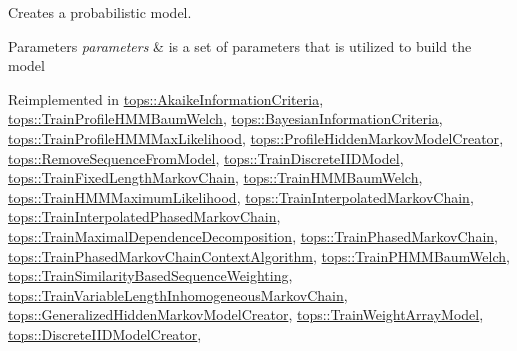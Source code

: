 Creates a probabilistic model. 


\begin{DoxyParams}{Parameters}
{\em parameters} & is a set of parameters that is utilized to build the model \\
\hline
\end{DoxyParams}


Reimplemented in \hyperlink{classtops_1_1AkaikeInformationCriteria_a925de08fa8373de8f7ddf48cd6b2c6e0}{tops\+::\+Akaike\+Information\+Criteria}, \hyperlink{classtops_1_1TrainProfileHMMBaumWelch_a90acae2f12580eeb2f2010c5321fd6f9}{tops\+::\+Train\+Profile\+H\+M\+M\+Baum\+Welch}, \hyperlink{classtops_1_1BayesianInformationCriteria_a025c7fff02580703f901376eea7db340}{tops\+::\+Bayesian\+Information\+Criteria}, \hyperlink{classtops_1_1TrainProfileHMMMaxLikelihood_ad73c7f1ec96af19a08186cfec7a141e7}{tops\+::\+Train\+Profile\+H\+M\+M\+Max\+Likelihood}, \hyperlink{classtops_1_1ProfileHiddenMarkovModelCreator_ac6787c8bf7b790c566ee01f4f0c67744}{tops\+::\+Profile\+Hidden\+Markov\+Model\+Creator}, \hyperlink{classtops_1_1RemoveSequenceFromModel_a46f4928e36936559659d9503c1edd550}{tops\+::\+Remove\+Sequence\+From\+Model}, \hyperlink{classtops_1_1TrainDiscreteIIDModel_a072a44dfaeb57cdffea9988f7a053bb8}{tops\+::\+Train\+Discrete\+I\+I\+D\+Model}, \hyperlink{classtops_1_1TrainFixedLengthMarkovChain_a13c61bbbe042026a4e406f5ba9214b0e}{tops\+::\+Train\+Fixed\+Length\+Markov\+Chain}, \hyperlink{classtops_1_1TrainHMMBaumWelch_a8c7334a4a970afc9dac9d66c1001999a}{tops\+::\+Train\+H\+M\+M\+Baum\+Welch}, \hyperlink{classtops_1_1TrainHMMMaximumLikelihood_a70881378e3f71eba8683df6e5e3d0433}{tops\+::\+Train\+H\+M\+M\+Maximum\+Likelihood}, \hyperlink{classtops_1_1TrainInterpolatedMarkovChain_aecbe1110e2a9c7479340b39e3d3c55ef}{tops\+::\+Train\+Interpolated\+Markov\+Chain}, \hyperlink{classtops_1_1TrainInterpolatedPhasedMarkovChain_a218b211bb755e02ffd30e8420d52d949}{tops\+::\+Train\+Interpolated\+Phased\+Markov\+Chain}, \hyperlink{classtops_1_1TrainMaximalDependenceDecomposition_a5a46f3f1f25d021766099e3dc6a470e6}{tops\+::\+Train\+Maximal\+Dependence\+Decomposition}, \hyperlink{classtops_1_1TrainPhasedMarkovChain_a31219afb1abf369674c2862a5017a112}{tops\+::\+Train\+Phased\+Markov\+Chain}, \hyperlink{classtops_1_1TrainPhasedMarkovChainContextAlgorithm_aa97236d43efb5312776d41ae36827d08}{tops\+::\+Train\+Phased\+Markov\+Chain\+Context\+Algorithm}, \hyperlink{classtops_1_1TrainPHMMBaumWelch_a7e11d58b3556af7dd44a85a18743a6ba}{tops\+::\+Train\+P\+H\+M\+M\+Baum\+Welch}, \hyperlink{classtops_1_1TrainSimilarityBasedSequenceWeighting_afccb17be7a84c13a4e7166a583b3597e}{tops\+::\+Train\+Similarity\+Based\+Sequence\+Weighting}, \hyperlink{classtops_1_1TrainVariableLengthInhomogeneousMarkovChain_a1a0e7cada3c58961aa186904214a6dac}{tops\+::\+Train\+Variable\+Length\+Inhomogeneous\+Markov\+Chain}, \hyperlink{classtops_1_1GeneralizedHiddenMarkovModelCreator_a8834cbceabf3922c348c632bb5e660e6}{tops\+::\+Generalized\+Hidden\+Markov\+Model\+Creator}, \hyperlink{classtops_1_1TrainWeightArrayModel_a7494fc0ad9ab876be3dd0ebee7613206}{tops\+::\+Train\+Weight\+Array\+Model}, \hyperlink{classtops_1_1DiscreteIIDModelCreator_a3eeca79afe4c57388385fed4299421d6}{tops\+::\+Discrete\+I\+I\+D\+Model\+Creator}, 